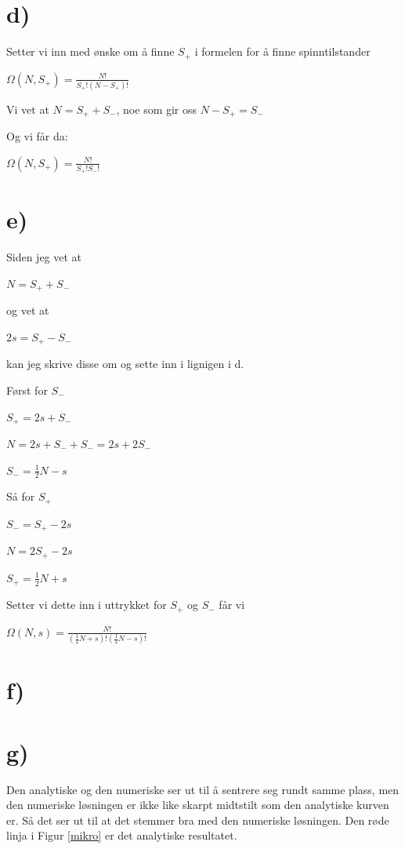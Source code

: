 \documentclass[norsk,12pt]{article}
\begin{document}
\section*{d)}

Setter vi inn med ønske om å finne $S_+$ i formelen for å finne spinntilstander

$\Omega (N,S_+) = \frac{N!}{S_+!(N-S_+)!}$

Vi vet at $N = S_+ + S_-$, noe som gir oss $ N-S_+ = S_-$ 

Og vi får da: 

$\Omega (N,S_+) = \frac{N!}{S_+!S_-!}$

\section*{e)}

Siden jeg vet at 

$ N = S_+ + S_-$ 

og vet at 

$ 2s = S_+-S_-$

kan jeg skrive disse om og sette inn i lignigen i d.

Først for $S_-$

$S_+ = 2s +S_-$ 

$N = 2s+S_- +S_- = 2s +2S_-$

$S_- = \frac{1}{2} N -s$

Så for $S_+$

$S_- = S_+ -2s$

$N = 2S_+ -2s$

$S_+ = \frac{1}{2} N +s$

Setter vi dette inn i uttrykket for $S_+ $ og $S_-$ får vi 

$\Omega (N,s) = \frac{N!}{(\frac{1}{2} N +s)! (\frac{1}{2}N - s)!}$


\section*{f)}

\section*{g)}

Den analytiske og den numeriske ser ut til å sentrere seg rundt samme plass, men den numeriske løsningen er ikke like skarpt midtstilt som den analytiske kurven er. Så det ser ut til at det stemmer bra med den numeriske løsningen. Den røde linja i Figur \ref{mikro} er det analytiske resultatet. 
\end{document}
